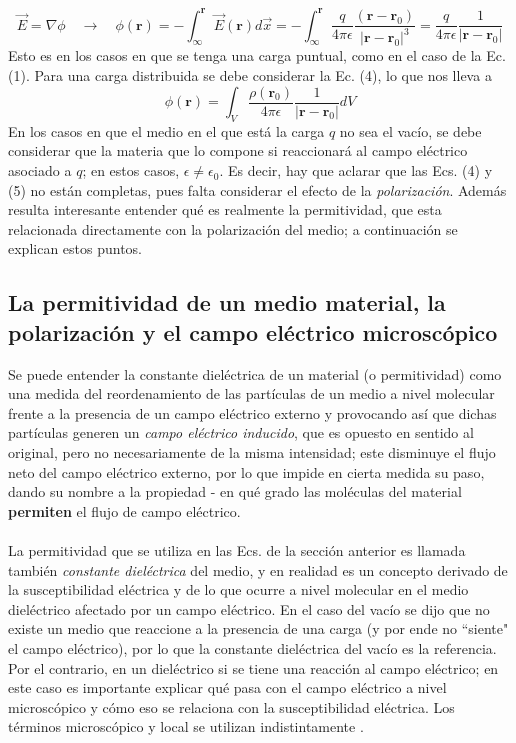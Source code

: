 \documentclass[12pt, notitlepage]{article}
\numberwithin{equation}{section}
\begin{document}
\begin{equation}
\vec{E} = \nabla\phi \quad\rightarrow\quad\phi{(\mathbf{r})} = -\int_\infty^{\mathbf{r}} \vec{E}(\mathbf{r}) d\vec{x} = -\int_\infty^{\mathbf{r}} \frac{q}{4\pi\epsilon}\frac{(\mathbf{r}-\mathbf{r}_0)}{|\mathbf{r} - \mathbf{r}_0|^3} = \frac{q}{4\pi\epsilon}\frac{1}{|\mathbf{r} - \mathbf{r}_0|}
\end{equation}
Esto es en los casos en que se tenga una carga puntual, como en el caso de la Ec. (1). Para una carga distribuida se debe considerar la Ec. (4), lo que nos lleva a
\begin{equation}
\phi(\mathbf{r}) = \int_V \frac{\rho(\mathbf{r}_0)}{4\pi\epsilon}\frac{1}{|\mathbf{r}-\mathbf{r}_0|}dV
\end{equation}
En los casos en que el medio en el que está la carga $q$ no sea el vacío, se debe considerar que la materia que lo compone si reaccionará al campo eléctrico asociado a $q$; en estos casos, $\epsilon \neq \epsilon_0$. Es decir, hay que aclarar que las Ecs. (4) y (5) no están completas, pues falta considerar el efecto de la \textit{polarización}. Además resulta interesante entender qué es realmente la permitividad, que esta relacionada directamente con la polarización del medio; a continuación se explican estos puntos.
\subsection{La permitividad de un medio material, la polarización y el campo eléctrico microscópico}
Se puede entender la constante dieléctrica de un material (o permitividad) como una medida del reordenamiento de las partículas de un medio a nivel molecular frente a la presencia de un campo eléctrico externo y provocando así que dichas partículas generen un \textit{campo eléctrico inducido}, que es opuesto en sentido al original, pero no necesariamente de la misma intensidad; este disminuye el flujo neto del campo eléctrico externo, por lo que impide en cierta medida su paso, dando su nombre a la propiedad - en qué grado las moléculas del material \textbf{permiten} el flujo de campo eléctrico.\\\\
La permitividad que se utiliza en las Ecs. de la sección anterior es llamada también \textit{constante dieléctrica} del medio, y en realidad es un concepto derivado de la susceptibilidad eléctrica y de lo que ocurre a nivel molecular en el medio dieléctrico afectado por un campo eléctrico. En el caso del vacío se dijo que no existe un medio que reaccione a la presencia de una carga (y por ende no ``siente" el campo eléctrico), por lo que la constante dieléctrica del vacío es la referencia. Por el contrario, en un dieléctrico si se tiene una reacción al campo eléctrico; en este caso es importante explicar qué pasa con el campo eléctrico a nivel microscópico y cómo eso se relaciona con la susceptibilidad eléctrica. Los términos microscópico y local se utilizan indistintamente \cite{Kantorovich}.
\end{document}
